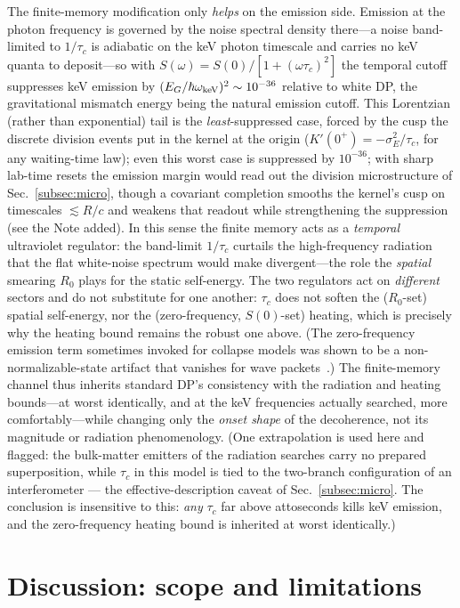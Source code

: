 \documentclass[aps,prd,onecolumn,amsmath,amssymb,nofootinbib,superscriptaddress]{revtex4-2}
\begin{document}
The finite-memory modification only \emph{helps} on the emission side. Emission at the photon frequency
is governed by the noise spectral density there---a noise band-limited to $1/\tau_c$ is adiabatic on the
keV photon timescale and carries no keV quanta to deposit---so with $S(\omega)=S(0)/[1+(\omega\tau_c)^2]$
the temporal cutoff suppresses keV emission by $(E_G/\hbar\omega_{\rm keV})^2\sim10^{-36}$ relative to
white DP, the gravitational mismatch energy being the natural emission cutoff. This Lorentzian (rather
than exponential) tail is the \emph{least}-suppressed case, forced by the cusp the discrete division
events put in the kernel at the origin ($K'(0^+)=-\sigma_E^2/\tau_c$, for any waiting-time law); even
this worst case is suppressed by $10^{-36}$; with sharp lab-time resets the emission margin would
read out the division microstructure of Sec.~\ref{subsec:micro}, though a covariant completion
smooths the kernel's cusp on timescales $\lesssim R/c$ and weakens that readout while strengthening
the suppression (see the Note added). In this sense the finite memory acts as a \emph{temporal}
ultraviolet regulator: the band-limit $1/\tau_c$ curtails the high-frequency radiation that the flat
white-noise spectrum would make divergent---the role the \emph{spatial} smearing $R_0$ plays for the
static self-energy. The two regulators act on \emph{different} sectors and do not substitute for one
another: $\tau_c$ does not soften the ($R_0$-set) spatial self-energy, nor the (zero-frequency,
$S(0)$-set) heating, which is precisely why the heating bound remains the robust one above. (The
zero-frequency emission term
sometimes invoked for collapse models was shown to be a non-normalizable-state artifact that vanishes
for wave packets~\cite{R9,R10}.) The finite-memory channel thus inherits standard DP's consistency with
the radiation and heating bounds---at worst identically, and at the keV frequencies actually searched,
more comfortably---while changing only the \emph{onset shape} of the decoherence, not its magnitude or
radiation phenomenology.  (One extrapolation is used here and flagged: the bulk-matter emitters of the
radiation searches carry no prepared superposition, while $\tau_c$ in this model is tied to the
two-branch configuration of an interferometer --- the effective-description caveat of
Sec.~\ref{subsec:micro}.  The conclusion is insensitive to this: \emph{any} $\tau_c$ far above
attoseconds kills keV emission, and the zero-frequency heating bound is inherited at worst
identically.)

\section{Discussion: scope and limitations}\label{sec:limits}
\end{document}
